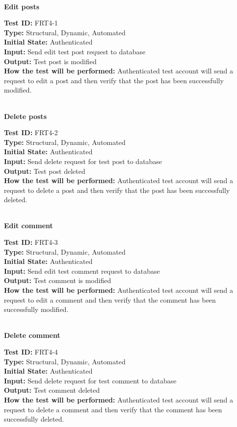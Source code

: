 \documentclass[12pt,fleqn]{article}
\begin{document}
\textbf{\\Edit posts}
\begin{tcolorbox}
\textbf{Test ID:} FRT4-1\\
\textbf{Type:} Structural, Dynamic, Automated\\
\textbf{Initial State:} Authenticated\\
\textbf{Input:} Send edit test post request to database\\
\textbf{Output:} Test post is modified\\
\textbf{How the test will be performed:} Authenticated test account will send a request to edit a post and then verify that the post has been successfully modified.
\end{tcolorbox}

\textbf{\\Delete posts}
\begin{tcolorbox}
\textbf{Test ID:} FRT4-2\\
\textbf{Type:} Structural, Dynamic, Automated\\
\textbf{Initial State:} Authenticated\\
\textbf{Input:} Send delete request for test post to database\\
\textbf{Output:} Test post deleted\\
\textbf{How the test will be performed:} Authenticated test account will send a request to delete a post and then verify that the post has been successfully deleted.
\end{tcolorbox}

\newpage

\textbf{\\Edit comment}
\begin{tcolorbox}
\textbf{Test ID:} FRT4-3\\
\textbf{Type:} Structural, Dynamic, Automated\\
\textbf{Initial State:} Authenticated\\
\textbf{Input:} Send edit test comment request to database\\
\textbf{Output:} Test comment is modified\\
\textbf{How the test will be performed:} Authenticated test account will send a request to edit a comment and then verify that the comment has been successfully modified.
\end{tcolorbox}

\textbf{\\Delete comment}
\begin{tcolorbox}
\textbf{Test ID:} FRT4-4\\
\textbf{Type:} Structural, Dynamic, Automated\\
\textbf{Initial State:} Authenticated\\
\textbf{Input:} Send delete request for test comment to database\\
\textbf{Output:} Test comment deleted\\
\textbf{How the test will be performed:} Authenticated test account will send a request to delete a comment and then verify that the comment has been successfully deleted.
\end{tcolorbox}
\end{document}
